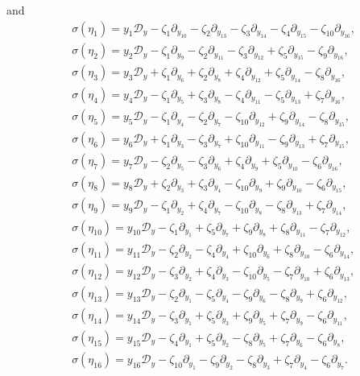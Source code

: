 \documentclass[12pt]{article}
\numberwithin{equation}{section}
\theoremstyle{definition}
\theoremstyle{remark}
\begin{document}
and
\begin{eqnarray}
	&\sigma(\eta_1)=y_1\mathcal{D}_y-\zeta_1\partial_{y_{10}}-\zeta_2\partial_{y_{13}}-\zeta_3\partial_{y_{14}}-\zeta_4\partial_{y_{15}}-\zeta_{10}\partial_{y_{16}},\\
	&\sigma(\eta_2)=y_2\mathcal{D}_y-\zeta_1\partial_{y_9}-\zeta_2\partial_{y_{11}}-\zeta_3\partial_{y_{12}}+\zeta_5\partial_{y_{15}}-\zeta_9\partial_{y_{16}}, \\
	&\sigma(\eta_3)=y_3\mathcal{D}_y+\zeta_1\partial_{y_6}+\zeta_2\partial_{y_8}+\zeta_4\partial_{y_{12}}+\zeta_5\partial_{y_{14}}-\zeta_8\partial_{y_{16}}, \\
	&\sigma(\eta_4)=y_4\mathcal{D}_y-\zeta_1\partial_{y_5}+\zeta_3\partial_{y_8}-\zeta_4\partial_{y_{11}}-\zeta_5\partial_{y_{13}}+\zeta_7\partial_{y_{16}}, \\
	&\sigma(\eta_5)=y_5\mathcal{D}_y-\zeta_1\partial_{y_4}-\zeta_2\partial_{y_7}-\zeta_{10}\partial_{y_{12}}+\zeta_9\partial_{y_{14}}-\zeta_8\partial_{y_{15}}, \\
	&\sigma(\eta_6)=y_6\mathcal{D}_y+\zeta_1\partial_{y_3}-\zeta_3\partial_{y_7}+\zeta_{10}\partial_{y_{11}}-\zeta_9\partial_{y_{13}}+\zeta_7\partial_{y_{15}}, \\
	&\sigma(\eta_7)=y_7\mathcal{D}_y-\zeta_2\partial_{y_5}-\zeta_3\partial_{y_6}+\zeta_4\partial_{y_9}+\zeta_5\partial_{y_{10}}-\zeta_6\partial_{y_{16}}, \\  &\sigma(\eta_8)=y_8\mathcal{D}_y+\zeta_2\partial_{y_3}+\zeta_3\partial_{y_4}-\zeta_{10}\partial_{y_9}+\zeta_9\partial_{y_{10}}-\zeta_6\partial_{y_{15}}, \\
	&\sigma(\eta_9)=y_9\mathcal{D}_y-\zeta_1\partial_{y_2}+\zeta_4\partial_{y_7}-\zeta_{10}\partial_{y_{8}}-\zeta_8\partial_{y_{13}}+\zeta_7\partial_{y_{14}}, \\
	&\sigma(\eta_{10})=y_{10}\mathcal{D}_y-\zeta_1\partial_{y_1}+\zeta_5\partial_{y_7}+\zeta_9\partial_{y_8}+\zeta_8\partial_{y_{11}}-\zeta_7\partial_{y_{12}}, \\
	&\sigma(\eta_{11})=y_{11}\mathcal{D}_y-\zeta_2\partial_{y_2}-\zeta_4\partial_{y_4}+\zeta_{10}\partial_{y_6}+\zeta_8\partial_{y_{10}}-\zeta_6\partial_{y_{14}}, \\
	&\sigma(\eta_{12})=y_{12}\mathcal{D}_y-\zeta_3\partial_{y_2}+\zeta_4\partial_{y_3}-\zeta_{10}\partial_{y_5}-\zeta_7\partial_{y_{10}}+\zeta_6\partial_{y_{13}}, \\
	&\sigma(\eta_{13})=y_{13}\mathcal{D}_y-\zeta_2\partial_{y_1}-\zeta_5\partial_{y_4}-\zeta_9\partial_{y_6}-\zeta_8\partial_{y_9}+\zeta_6\partial_{y_{12}}, \\
	&\sigma(\eta_{14})=y_{14}\mathcal{D}_y-\zeta_3\partial_{y_1}+\zeta_5\partial_{y_3}+\zeta_9\partial_{y_5}+\zeta_7\partial_{y_9}-\zeta_6\partial_{y_{11}}, \\
	&\sigma(\eta_{15})=y_{15}\mathcal{D}_y-\zeta_4\partial_{y_1}+\zeta_5\partial_{y_2}-\zeta_8\partial_{y_5}+\zeta_7\partial_{y_6}-\zeta_6\partial_{y_8}, \\
	&\sigma(\eta_{16})=y_{16}\mathcal{D}_y-\zeta_{10}\partial_{y_1}-\zeta_9\partial_{y_2}-\zeta_8\partial_{y_3}+\zeta_7\partial_{y_4}-\zeta_6\partial_{y_7}.
\end{eqnarray}
\end{document}
